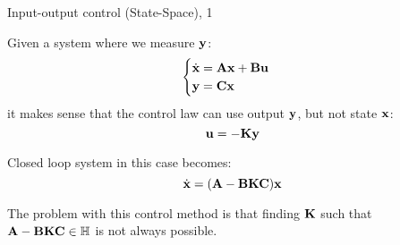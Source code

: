 \documentclass{beamer}
\begin{document}
\begin{frame}{}
	
	
\end{frame}


\begin{frame}{Input-output control (State-Space), 1}
	\begin{flushleft}
		
		Given a system where we measure $\mathbf{y}$:
		\begin{equation}
			\begin{cases}
				\dot{\mathbf{x}} = \mathbf{A}\mathbf{x} + \mathbf{B}\mathbf{u} \\
				\mathbf{y} = \mathbf{C}\mathbf{x}
			\end{cases}
		\end{equation}
		it makes sense that the control law can use output $\mathbf{y}$, but not state $\mathbf{x}$:
		\begin{equation}
			\mathbf{u} = -\mathbf{K}\mathbf{y} 
		\end{equation}		
		
		Closed loop system in this case becomes: 
		\begin{equation}
			\dot{\mathbf{x}} = (\mathbf{A}- \mathbf{B}\mathbf{K}\mathbf{C})\mathbf{x} 
		\end{equation}		
		
		The problem with this control method is that finding $\mathbf{K}$ such that $\mathbf{A}- \mathbf{B}\mathbf{K}\mathbf{C} \in \mathbb{H}$ is not always possible.
		
	\end{flushleft}
\end{frame}
\end{document}
